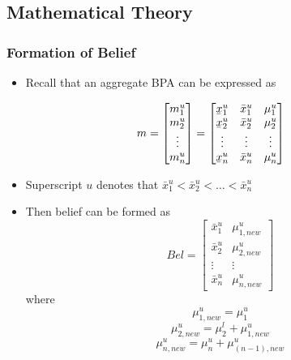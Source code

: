 \documentclass{beamer}
\newcommand{\ubar}[1]{\underaccent{\bar}{#1}}
\begin{document}
\subsection{Mathematical Theory}

\begin{frame}[allowframebreaks]
\frametitle{Formation of Belief}
\begin{itemize}
\item{Recall that an aggregate BPA can be expressed as}
\end{itemize}
\begin{equation}
m = \begin{bmatrix*}
m_1^u \\
m_2^u \\
\vdots \\
m_n^u \end{bmatrix*}
= \begin{bmatrix*}
\ubar{x}_1^u & \bar{x}_1^u & \mu_1^u \\
\ubar{x}_2^u & \bar{x}_2^u & \mu_2^u \\
\vdots & \vdots & \vdots \\
\ubar{x}_n^u & \bar{x}_n^u & \mu_n^u \\ \end{bmatrix*}
\label{m-1}
\end{equation}
\begin{itemize}
\item{Superscript $u$ denotes that $\bar{x}_1^u < \bar{x}_2^u < \dots < \bar{x}_n^u$}
\framebreak
\item{Then belief can be formed as
\begin{equation}
Bel = \begin{bmatrix*}
\bar{x}_1^u & \mu_{1,new}^u \\
\bar{x}_2^u & \mu_{2,new}^u \\
\vdots & \vdots \\
\bar{x}_n^u & \mu_{n,new}^u \end{bmatrix*}
\end{equation}
where 
\begin{equation}
\mu_{1,new}^u = \mu_1^u
\label{mu1l}
\end{equation}
\begin{equation}
\mu_{2,new}^u = \mu_2^l+\mu_{1,new}^u
\label{mu2l}
\end{equation}
\begin{equation}
\mu_{n,new}^u = \mu_n^u+\mu_{(n-1),new}^u
\label{munl}
\end{equation}}
\end{itemize}
\end{frame}
\end{document}
